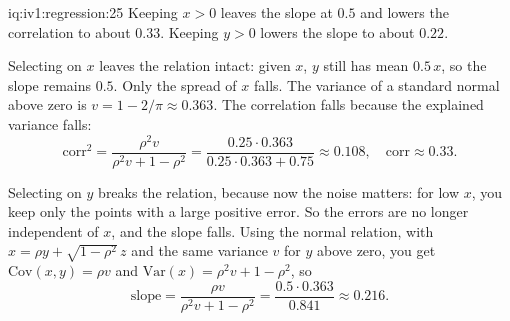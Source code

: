 \begin{solution}{iq:iv1:regression:25}
Keeping $x > 0$ leaves the slope at $0.5$ and lowers the correlation to about $0.33$. Keeping $y > 0$ lowers the slope to about $0.22$.

Selecting on $x$ leaves the relation intact: given $x$, $y$ still has mean $0.5\,x$, so the slope remains $0.5$. Only the spread of $x$ falls. The variance of a standard normal above zero is $v = 1 - 2/\pi \approx 0.363$. The correlation falls because the explained variance falls:
\[
\text{corr}^2 = \frac{\rho^2 v}{\rho^2 v + 1 - \rho^2} = \frac{0.25 \cdot 0.363}{0.25 \cdot 0.363 + 0.75} \approx 0.108, \quad \text{corr} \approx 0.33.
\]

Selecting on $y$ breaks the relation, because now the noise matters: for low $x$, you keep only the points with a large positive error. So the errors are no longer independent of $x$, and the slope falls. Using the normal relation, with $x = \rho y + \sqrt{1 - \rho^2}\,z$ and the same variance $v$ for $y$ above zero, you get $\mathrm{Cov}(x,y) = \rho v$ and $\mathrm{Var}(x) = \rho^2 v + 1 - \rho^2$, so
\[
\text{slope} = \frac{\rho v}{\rho^2 v + 1 - \rho^2} = \frac{0.5 \cdot 0.363}{0.841} \approx 0.216.
\]

\end{solution}

